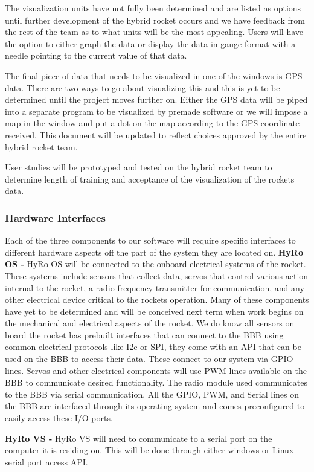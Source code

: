 \documentclass[10pt,draftclsnofoot,onecolumn,compsoc]{IEEEtran}
\begin{document}
The visualization units have not fully been determined and are listed as options until further development of the hybrid rocket occurs and we have feedback from the rest of the team as to what units will be the most appealing. Users will have the option to either graph the data or display the data in gauge format with a needle pointing to the current value of that data. \par

	The final piece of data that needs to be visualized in one of the windows is GPS data. There are two ways to go about visualizing this and this is yet to be determined until the project moves further on. Either the GPS data will be piped into a separate program to be visualized by premade software or we will impose a map in the window and put a dot on the map according to the GPS coordinate received. This document will be updated to reflect choices approved by the entire hybrid rocket team. \par

	User studies will be prototyped and tested on the hybrid rocket team to determine length of training and acceptance of the visualization of the rockets data. \par

\subsubsection{Hardware Interfaces}
Each of the three components to our software will require specific interfaces to different hardware aspects off the part of the system they are located on. 
{\bf HyRo OS -}
 	HyRo OS will be connected to the onboard electrical systems of the rocket. These systems include sensors that collect data, servos that control various action internal to the rocket, a radio frequency transmitter for communication, and any other electrical device critical to the rockets operation. Many of these components have yet to be determined and will be conceived next term when work begins on the mechanical and electrical aspects of the rocket.  We do know all sensors on board the rocket has prebuilt interfaces that can connect to the BBB using common electrical protocols like I2c or SPI, they come with an API that can be used on the BBB to access their data. These connect to our system via GPIO lines. Servos and other electrical components will use PWM lines available on the BBB to communicate desired functionality. The radio module used communicates to the BBB via serial communication. All the GPIO, PWM, and Serial lines on the BBB are interfaced through its operating system and comes preconfigured to easily access these I/O ports.\par
{\bf HyRo VS -}
HyRo VS will need to communicate to a serial port on the computer it is residing on.  This will be done through either windows or Linux serial port access API.
\end{document}
